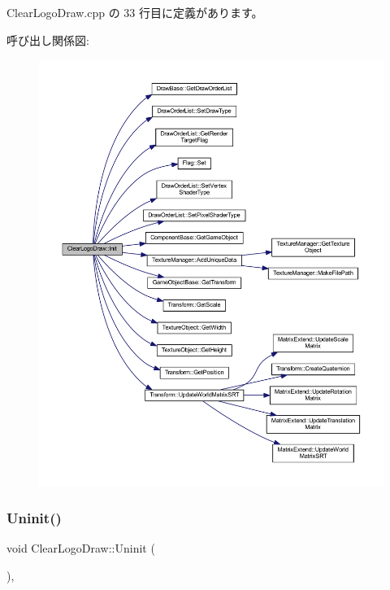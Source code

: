 Clear\+Logo\+Draw.\+cpp の 33 行目に定義があります。

呼び出し関係図\+:\nopagebreak
\begin{figure}[H]
\begin{center}
\leavevmode
\includegraphics[width=350pt]{class_clear_logo_draw_a9af656c0a8ebfb5fa133a0983add6ffd_cgraph}
\end{center}
\end{figure}
\mbox{\label{class_clear_logo_draw_aa73db5b701e644f8e552ddb254a0a9aa}} 
\subsubsection{\texorpdfstring{Uninit()}{Uninit()}}
{\footnotesize\ttfamily void Clear\+Logo\+Draw\+::\+Uninit (\begin{DoxyParamCaption}{ }\end{DoxyParamCaption})\hspace{0.3cm}{\ttfamily [override]}, {\ttfamily [virtual]}}



